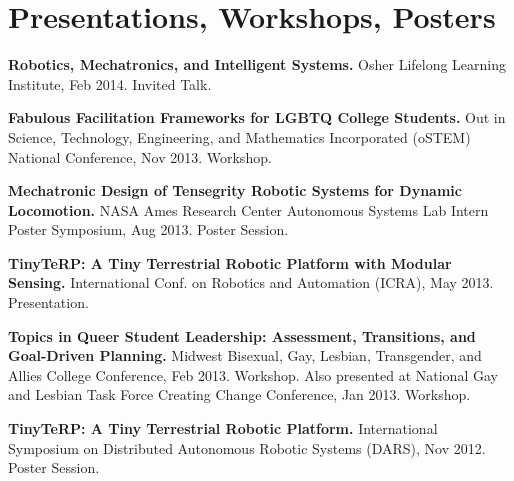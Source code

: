 \documentclass[letterpaper]{deedy-resume} %
\begin{document}
\begin{minipage}[t]{1\textwidth}%




\section{Presentations, Workshops, Posters}

\vspace{0.4cm}
\begin{tightitemize}

\item \textbf{Robotics, Mechatronics, and Intelligent Systems.} Osher Lifelong Learning Institute, Feb 2014. Invited Talk.

\item \textbf{Fabulous Facilitation Frameworks for LGBTQ College Students.} Out in Science, Technology, Engineering, and Mathematics Incorporated (oSTEM) National Conference, Nov 2013. Workshop.

\item \textbf{Mechatronic Design of Tensegrity Robotic Systems for Dynamic Locomotion.} NASA Ames Research Center Autonomous Systems Lab Intern Poster Symposium, Aug 2013. Poster Session.

\item \textbf{TinyTeRP: A Tiny Terrestrial Robotic Platform with Modular Sensing.} International Conf. on Robotics and Automation (ICRA), May 2013. Presentation.

\item \textbf{Topics in Queer Student Leadership: Assessment, Transitions, and Goal-Driven Planning.} Midwest Bisexual, Gay, Lesbian, Transgender, and Allies College Conference, Feb 2013. Workshop. Also presented at National Gay and Lesbian Task Force Creating Change Conference, Jan 2013. Workshop.

\item \textbf{TinyTeRP: A Tiny Terrestrial Robotic Platform.} International Symposium on Distributed Autonomous Robotic Systems (DARS), Nov 2012. Poster Session.

\end{tightitemize}


\end{minipage}%
\end{document}
